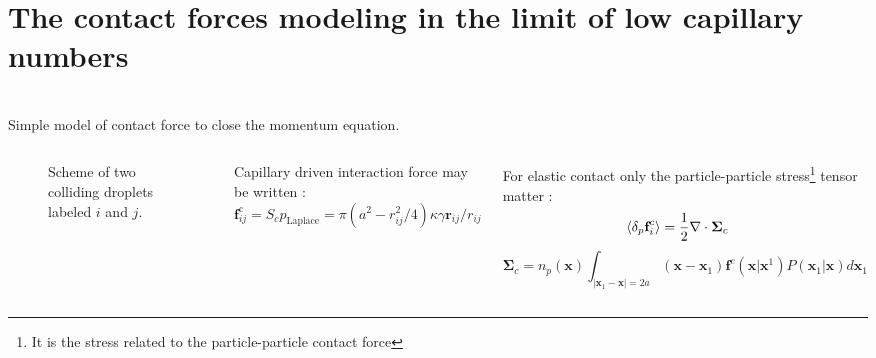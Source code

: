 \documentclass{sintefbeamer}
\begin{document}
  
\section{The contact forces modeling in the limit of low capillary numbers}
\section*{}

\begin{frame}{Simple model of contact force to close the momentum equation.}
  \begin{columns}
  \centering
  \begin{figure} 
    \caption{Scheme of two colliding droplets labeled $i$ and $j$.}
  \end{figure}
  
  Capillary driven interaction force may be written : 
  \begin{equation*}
    \textbf{f}_{ij}^\text{c}
    = S_c p_\text{Laplace}
    = \pi (a^2 - r_{ij}^2/4) \kappa \gamma  \textbf{r}_{ij}/r_{ij}
\end{equation*} 


For elastic contact only the  particle-particle stress\footnote{It is the stress related to the particle-particle contact force} tensor matter \citep{zhang1997momentum,jackson1997locally} : 
  \begin{align}    
    \left<\delta_p \textbf{f}_i^c\right>
    &= \frac{1}{2}\mathbf{\nabla}\cdot \bm\Sigma_c
\end{align}
\begin{equation*}
  \bm\Sigma_c 
  =n_p(\textbf{x}) \int_{|\textbf{x}_1 - \textbf{x}| = 2a}
  (\textbf{x} - \textbf{x}_1) \textbf{f}^c(\textbf{x}| \textbf{x}^1) P(\textbf{x}_1|\textbf{x}) d\textbf{x}_1
\end{equation*}


\end{columns}
\end{frame}
\end{document}
